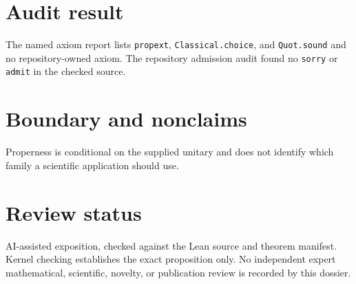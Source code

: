 \documentclass[11pt]{article}
\begin{document}
\section{Audit result}
The named axiom report lists \texttt{propext}, \texttt{Classical.choice}, and
\texttt{Quot.sound} and no repository-owned axiom.  The repository admission audit found no
\texttt{sorry} or \texttt{admit} in the checked source.

\section{Boundary and nonclaims}
Properness is conditional on the supplied unitary and does not identify which family a scientific application should use.

\section{Review status}
AI-assisted exposition, checked against the Lean source and theorem manifest.  Kernel checking
establishes the exact proposition only.  No independent expert mathematical, scientific,
novelty, or publication review is recorded by this dossier.
\end{document}
